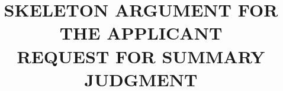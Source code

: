 \documentclass[a4paper]{article}
\title{%
SKELETON ARGUMENT FOR THE APPLICANT \\
REQUEST FOR SUMMARY JUDGMENT
}
\begin{document}
\maketitle
\blindtext
\end{document}
